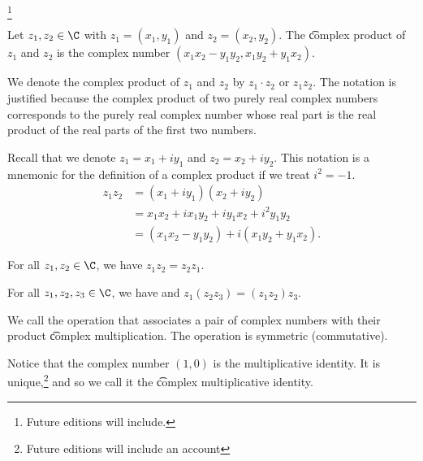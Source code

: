 
\footnote{Future editions will include.}


Let $z_1, z_2 \in \C$ with $z_1 = (x_1, y_1)$ and $z_2 = (x_2, y_2)$.
The \t{complex product} of $z_1$ and $z_2$ is the complex number $(x_1x_2 - y_1y_2, x_1y_2 + y_1x_2)$.


We denote the complex product of $z_1$ and $z_2$ by $z_1 \cdot z_2$ or $z_1z_2$.
The notation is justified because the complex product of two purely real complex numbers corresponds to the purely real complex number whose real part is the real product of the real parts of the first two numbers.

Recall that we denote $z_1 = x_1 + iy_1$ and $z_2 = x_2 + iy_2$.
This notation is a mnemonic for the definition of a complex product if we treat $i^2 = -1$.
\[
\begin{aligned}
	z_1z_2 &= (x_1 + iy_1)(x_2 + iy_2) \\
		   &= x_1x_2 + ix_1y_2 + iy_1x_2 + i^2 y_1y_2 \\
		   &= (x_1x_2 - y_1y_2) + i(x_1y_2 + y_1x_2).
\end{aligned}
\]


\begin{proposition}[Commutativity]
  For all $z_1, z_2 \in \C$, we have $z_1z_2 = z_2z_1$.
\end{proposition}

\begin{proposition}[Associativity]
For all $z_1, z_2, z_3 \in \C$, we have
  and $z_1(z_2z_3) = (z_1z_2)z_3$.
\end{proposition}


We call the operation that associates a pair of complex numbers with their product \t{complex multiplication}.
The operation is symmetric (commutative).


Notice that the complex number $(1, 0)$ is the multiplicative identity.
It is unique,\footnote{Future editions will include an account} and so we call it the \t{complex multiplicative identity.}


\blankpage
